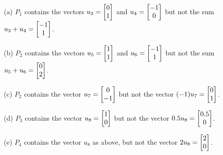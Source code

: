\documentclass[a4paper]{amsart}
\renewenvironment{solution}{\SolutionInline}{\endSolutionInline}
\begin{document}
\begin{solution}
 \begin{itemize}
  \item[(a)] $P_1$ contains the vectors $u_3=\left[\begin{matrix} 0\\1\end{matrix}\right]$ and
   $u_4=\left[\begin{matrix} -1\\0\end{matrix}\right]$ but not the sum $u_3+u_4=\left[\begin{matrix} -1\\1\end{matrix}\right]$.
  \item[(b)] $P_2$ contains the vectors $u_5=\left[\begin{matrix} 1\\1\end{matrix}\right]$ and
   $u_6=\left[\begin{matrix} -1\\1\end{matrix}\right]$ but not the sum $u_5+u_6=\left[\begin{matrix} 0\\2\end{matrix}\right]$.
  \item[(c)] $P_2$ contains the vector $u_7=\left[\begin{matrix} 0\\-1\end{matrix}\right]$ but not
   the vector $(-1)u_7=\left[\begin{matrix} 0\\ 1\end{matrix}\right]$.
  \item[(d)] $P_3$ contains the vector $u_8=\left[\begin{matrix} 1\\0\end{matrix}\right]$ but not the
   vector $0.5u_8=\left[\begin{matrix} 0.5\\0\end{matrix}\right]$.
  \item[(e)] $P_4$ contains the vector $u_8$ as above, but not the
   vector $2u_8=\left[\begin{matrix} 2\\0\end{matrix}\right]$.
 \end{itemize}
\end{solution}
\end{document}
